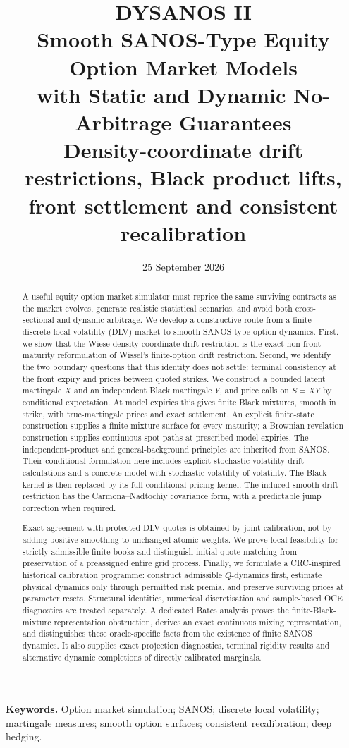 \documentclass[11pt,a4paper]{article}
\title{\textbf{DYSANOS II}\\[3mm]
Smooth SANOS-Type Equity Option Market Models\\
with Static and Dynamic No-Arbitrage Guarantees\\[3mm]
\large Density-coordinate drift restrictions, Black product lifts,\\
front settlement and consistent recalibration}
\author{}
\date{25 September 2026}
\numberwithin{equation}{section}
\theoremstyle{definition}\newtheorem{definition}[theorem]{Definition}
\theoremstyle{remark}\newtheorem{remark}[theorem]{Remark}
\begin{document}
\maketitle
\begin{abstract}
A useful equity option market simulator must reprice the same surviving contracts as the market evolves, generate realistic statistical scenarios, and avoid both cross-sectional and dynamic arbitrage. We develop a constructive route from a finite discrete-local-volatility (DLV) market to smooth SANOS-type option dynamics. First, we show that the Wiese density-coordinate drift restriction is the exact non-front-maturity reformulation of Wissel's finite-option drift restriction. Second, we identify the two boundary questions that this identity does not settle: terminal consistency at the front expiry and prices between quoted strikes. We construct a bounded latent martingale $X$ and an independent Black martingale $Y$, and price calls on $S=XY$ by conditional expectation. At model expiries this gives finite Black mixtures, smooth in strike, with true-martingale prices and exact settlement. An explicit finite-state construction supplies a finite-mixture surface for every maturity; a Brownian revelation construction supplies continuous spot paths at prescribed model expiries. The independent-product and general-background principles are inherited from SANOS. Their conditional formulation here includes explicit stochastic-volatility drift calculations and a concrete model with stochastic volatility of volatility. The Black kernel is then replaced by its full conditional pricing kernel. The induced smooth drift restriction has the Carmona--Nadtochiy covariance form, with a predictable jump correction when required.

Exact agreement with protected DLV quotes is obtained by joint calibration, not by adding positive smoothing to unchanged atomic weights. We prove local feasibility for strictly admissible finite books and distinguish initial quote matching from preservation of a preassigned entire grid process. Finally, we formulate a CRC-inspired historical calibration programme: construct admissible $Q$-dynamics first, estimate physical dynamics only through permitted risk premia, and preserve surviving prices at parameter resets. Structural identities, numerical discretisation and sample-based OCE diagnostics are treated separately. A dedicated Bates analysis proves the finite-Black-mixture representation obstruction, derives an exact continuous mixing representation, and distinguishes these oracle-specific facts from the existence of finite SANOS dynamics. It also supplies exact projection diagnostics, terminal rigidity results and alternative dynamic completions of directly calibrated marginals.
\end{abstract}
\vspace{2mm}
\noindent\textbf{Keywords.} Option market simulation; SANOS; discrete local volatility; martingale measures; smooth option surfaces; consistent recalibration; deep hedging.
\newpage\tableofcontents
\newpage
\end{document}

